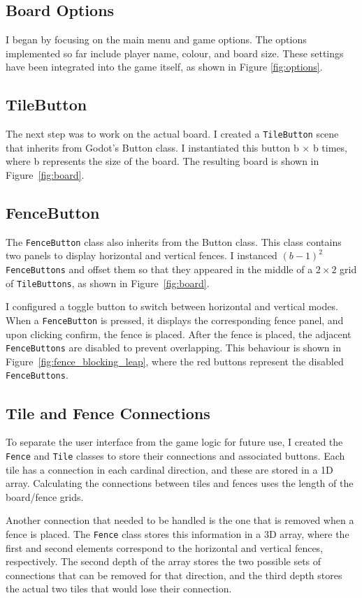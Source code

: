 \documentclass[progress]{cmpreport}
\begin{document}
\subsection{Board Options}
I began by focusing on the main menu and game options. The options implemented so far include player name, colour, and board size. These settings have been integrated into the game itself, as shown in Figure \ref{fig:options}.

\subsection{TileButton}
The next step was to work on the actual board. I created a \texttt{TileButton} scene that inherits from Godot's Button class. I instantiated this button b × b times, where b represents the size of the board. The resulting board is shown in Figure~\ref{fig:board}.

\subsection{FenceButton}
The \texttt{FenceButton} class also inherits from the Button class. This class contains two panels to display horizontal and vertical fences. I instanced \((b-1)^2\) \texttt{FenceButtons} and offset them so that they appeared in the middle of a \(2 \times 2\) grid of \texttt{TileButtons}, as shown in Figure~\ref{fig:board}.

\noindent I configured a toggle button to switch between horizontal and vertical modes. When a \texttt{FenceButton} is pressed, it displays the corresponding fence panel, and upon clicking confirm, the fence is placed. After the fence is placed, the adjacent \texttt{FenceButtons} are disabled to prevent overlapping. This behaviour is shown in Figure~\ref{fig:fence_blocking_leap}, where the red buttons represent the disabled \texttt{FenceButtons}.  

\subsection{Tile and Fence Connections}
To separate the user interface from the game logic for future use, I created the \texttt{Fence} and \texttt{Tile} classes to store their connections and associated buttons. Each tile has a connection in each cardinal direction, and these are stored in a 1D array. Calculating the connections between tiles and fences uses the length of the board/fence grids.  

Another connection that needed to be handled is the one that is removed when a fence is placed. The \texttt{Fence} class stores this information in a 3D array, where the first and second elements correspond to the horizontal and vertical fences, respectively. The second depth of the array stores the two possible sets of connections that can be removed for that direction, and the third depth stores the actual two tiles that would lose their connection.  
\end{document}
